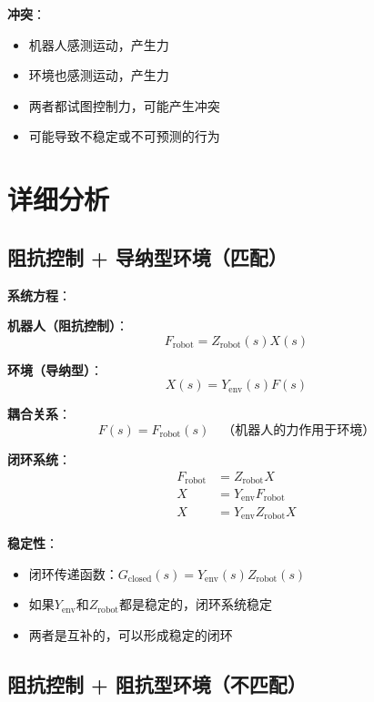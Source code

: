 \documentclass[12pt,a4paper]{article}
\begin{document}
\textbf{冲突}：
\begin{itemize}
\item 机器人感测运动，产生力
\item 环境也感测运动，产生力
\item 两者都试图控制力，可能产生冲突
\item 可能导致不稳定或不可预测的行为
\end{itemize}

\section{详细分析}

\subsection{阻抗控制 + 导纳型环境（匹配）}

\textbf{系统方程}：

\textbf{机器人（阻抗控制）}：
\begin{equation}
F_{\text{robot}} = Z_{\text{robot}}(s) X(s)
\end{equation}

\textbf{环境（导纳型）}：
\begin{equation}
X(s) = Y_{\text{env}}(s) F(s)
\end{equation}

\textbf{耦合关系}：
\begin{equation}
F(s) = F_{\text{robot}}(s) \quad \text{（机器人的力作用于环境）}
\end{equation}

\textbf{闭环系统}：
\begin{align}
F_{\text{robot}} &= Z_{\text{robot}} X \\
X &= Y_{\text{env}} F_{\text{robot}} \\
X &= Y_{\text{env}} Z_{\text{robot}} X
\end{align}

\textbf{稳定性}：
\begin{itemize}
\item 闭环传递函数：$G_{\text{closed}}(s) = Y_{\text{env}}(s) Z_{\text{robot}}(s)$
\item 如果$Y_{\text{env}}$和$Z_{\text{robot}}$都是稳定的，闭环系统稳定
\item 两者是互补的，可以形成稳定的闭环
\end{itemize}

\subsection{阻抗控制 + 阻抗型环境（不匹配）}
\end{document}
